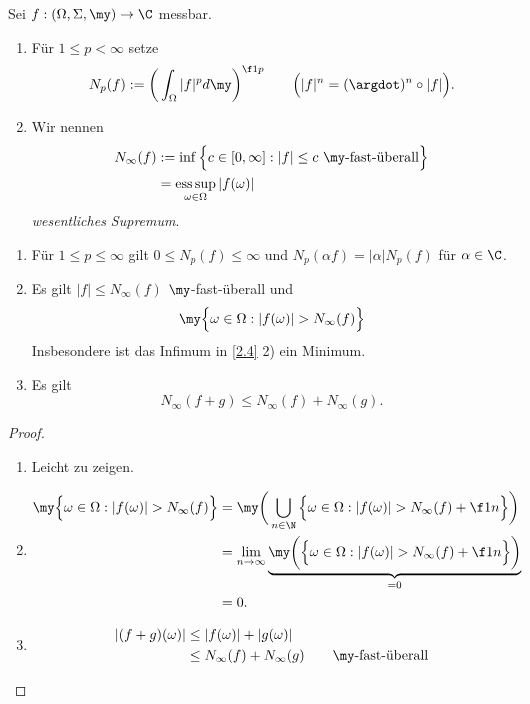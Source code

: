 \begin{df} \label{2.4}
	Sei $f: (\Omega, \Sigma, \my) \to \C$ messbar.
	\begin{enumerate}[1)]
		\item
			Für $1 \le p < \infty$ setze
			\[
				N_p(f) := \bigg( \int_{\Omega} |f|^p d\my \bigg)^{\f 1p}
				\qquad \Big( |f|^n = (\argdot)^n \circ |f| \Big).
			\]
		\item
			Wir nennen
			\begin{align*}
					\displaystyle N_\infty(f) 
					&:= \inf \Big\{ c \in [0,\infty] : |f|\le c \text{ $\my$-fast-überall} \Big\} \\
					&= \esssup_{\omega \in \Omega} |f(\omega)|
			\end{align*}
			\emph{wesentliches Supremum}.
	\end{enumerate}
\end{df}

\begin{st}[Eigenschaften] \label{2.5}
	\begin{enumerate}[1)]
		\item
			Für $1 \le p \le \infty$ gilt $0 \le N_p(f) \le \infty$ und $N_p(\alpha f) = |\alpha| N_p(f)$ für $\alpha \in \C$.
		\item
			Es gilt $|f| \le N_\infty(f)$ $\my$-fast-überall und 
			\[
				\my \Big\{ \omega \in \Omega : |f(\omega)| > N_\infty(f) \Big\}
				\]
			Insbesondere ist das Infimum in \ref{2.4} 2) ein Minimum.
		\item
			Es gilt
			\[
				N_\infty(f+g) \le N_\infty (f) + N_\infty(g).
			\]
	\end{enumerate}
	\begin{proof}
		\begin{enumerate}[1)]
			\item Leicht zu zeigen.
			\item
			\begin{align*}
				\my \Big\{ \omega \in \Omega : |f(\omega)| > N_\infty(f) \Big\}
				&= \my \bigg( \bigcup_{n\in \N} \Big\{ \omega \in \Omega : |f(\omega)| > N_\infty(f) + \f 1n \Big\} \bigg) \\
				&= \lim_{n\to \infty }\underbrace{\my \bigg( \Big\{ \omega \in \Omega : |f(\omega)| > N_\infty(f) + \f 1n \Big\} \bigg)}_{=0} \\
				&=  0.
			\end{align*}
			\item 
			\begin{align*}
				|(f+g)(\omega)|
				& \le |f(\omega)| + |g(\omega)| \\
				& \le N_\infty(f) + N_\infty(g) \qquad \text{$\my$-fast-überall}
			\end{align*}
		\end{enumerate}
	\end{proof}
\end{st}

